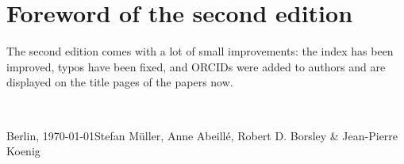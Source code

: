 \section*{Foreword of the second edition}

The second edition comes with a lot of small improvements: the index has been improved, typos have
been fixed, and ORCIDs were added to authors and are displayed on the title pages of the papers now.








%
%
%


~\medskip

\noindent
Berlin, \today\hfill Stefan Müller, Anne Abeillé, Robert D. Borsley \& Jean-​Pierre Koenig


